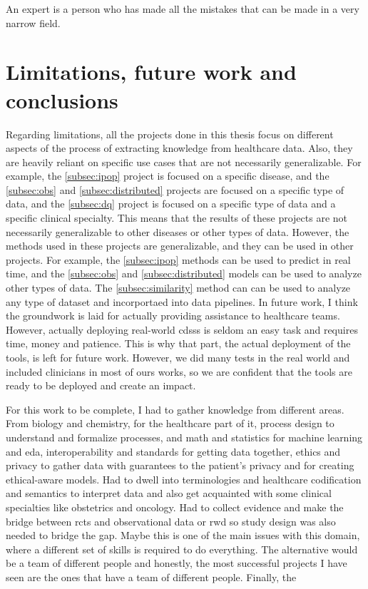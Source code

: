 \begin{savequote}[75mm]
An expert is a person who has made all the mistakes that can be made in a very narrow field.
\end{savequote}
\chapter{Limitations, future work and conclusions} \label{chap:conclusion}

Regarding limitations, all the projects done in this thesis focus on different aspects of the process of extracting knowledge from healthcare data. Also, they are heavily reliant on specific use cases that are not necessarily generalizable. For example, the \ref{subsec:ipop} project is focused on a specific disease, and the \ref{subsec:obs} and \ref{subsec:distributed} projects are focused on a specific type of data, and the \ref{subsec:dq} project is focused on a specific type of data and a specific clinical specialty. This means that the results of these projects are not necessarily generalizable to other diseases or other types of data. However, the methods used in these projects are generalizable, and they can be used in other projects. For example, the \ref{subsec:ipop} methods can be used to predict in real time, and the \ref{subsec:obs} and \ref{subsec:distributed} models can be used to analyze other types of data. The \ref{subsec:similarity} method can can be used to analyze any type of dataset and incorportaed into data pipelines.
In future work, I think the groundwork is laid for actually providing assistance to healthcare teams. However, actually deploying real-world \acp{cdss} is seldom an easy task and requires time, money and patience. This is why that part, the actual deployment of the tools, is left for future work. However, we did many tests in the real world and included clinicians in most of ours works, so we are confident that the tools are ready to be deployed and create an impact.



For this work to be complete, I had to gather knowledge from different areas. From biology and chemistry, for the healthcare part of it, process design to understand and formalize processes, and math and statistics for machine learning and \ac{eda}, interoperability and standards for getting data together, ethics and privacy to gather data with guarantees to the patient's privacy and for creating ethical-aware models. Had to dwell into terminologies and healthcare codification and semantics to interpret data and also get acquainted with some clinical specialties like obstetrics and oncology. Had to collect evidence and make the bridge between \acp{rct} and observational data or \ac{rwd} so study design was also needed to bridge the gap.
Maybe this is one of the main issues with this domain, where a different set of skills is required to do everything. The alternative would be a team of different people and honestly, the most successful projects I have seen are the ones that have a team of different people.
Finally, the 

